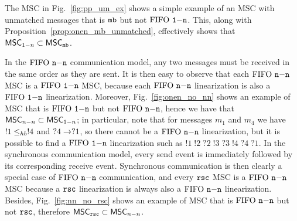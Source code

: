 The MSC in Fig.~\ref{fig:pp_um_ex} shows a simple example of an MSC with unmatched messages that is $\mathtt{mb}$ but not $\text{FIFO } \mathtt{1\mathsf{-}n}$. This, along with Proposition~\ref{prop:onen_mb_unmatched}, effectively shows that $\mathsf{MSC}_{1\mathsf{-}n} \subset \mathsf{MSC}_{\mathtt{mb}}$.

\medskip 

In the $\text{FIFO } \mathtt{n\mathsf{-}n}$ communication model, any two messages must be received in the same order as they are sent. It is then easy to observe that each $\text{FIFO } \mathtt{n\mathsf{-}n}$ MSC is a $\text{FIFO } \mathtt{1\mathsf{-}n}$ MSC, because each $\text{FIFO } \mathtt{n\mathsf{-}n}$ linearization is also a $\text{FIFO } \mathtt{1\mathsf{-}n}$ linearization. Moreover, Fig.~\ref{fig:onen_no_nn} shows an example of MSC that is $\text{FIFO } \mathtt{1\mathsf{-}n}$ but not $\text{FIFO } \mathtt{n\mathsf{-}n}$, hence we have that $\mathsf{MSC}_{n\mathsf{-}n} \subset \mathsf{MSC}_{1\mathsf{-}n}$; in particular, note that for messages $m_1$ and $m_4$ we have $!1 \leq_{hb} !4$ and $?4 \to ?1$, so there cannot be a $\text{FIFO } \mathtt{n\mathsf{-}n}$ linearization, but it is possible to find a $\text{FIFO } \mathtt{1\mathsf{-}n}$ linearization such as $!1\;!2\;?2\;!3\;?3\;!4\;?4\;?1$. In the synchronous communication model, every send event is immediately followed by its corresponding receive event. Synchronous communication is then clearly a special case of $\text{FIFO } \mathtt{n\mathsf{-}n}$ communication, and every $\mathtt{rsc}$ MSC is a $\text{FIFO } \mathtt{n\mathsf{-}n}$ MSC because a $\mathtt{rsc}$ linearization is always also a $\text{FIFO } \mathtt{n\mathsf{-}n}$ linearization. Besides, Fig.~\ref{fig:nn_no_rsc} shows an example of MSC that is $\text{FIFO } \mathtt{n\mathsf{-}n}$ but not $\mathtt{rsc}$, therefore $\mathsf{MSC}_{\mathtt{rsc}} \subset \mathsf{MSC}_{n\mathsf{-}n}$.
